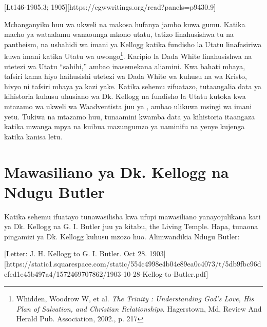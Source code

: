 [Lt146-1905.3; 1905][https://egwwritings.org/read?panels=p9430.9]

Mchanganyiko huu wa ukweli na makosa hufanya jambo kuwa gumu. Katika macho ya wataalamu wanaounga mkono utatu, tatizo linahusishwa tu na pantheism, na ushahidi wa imani ya Kellogg katika fundisho la Utatu linafasiriwa kuwa imani katika Utatu wa uwongo\footnote{Whidden, Woodrow W, et al. \textit{The Trinity : Understanding God's Love, His Plan of Salvation, and Christian Relationships}. Hagerstown, Md, Review And Herald Pub. Association, 2002., p. 217}. Karipio la Dada White linahusishwa na utetezi wa Utatu “sahihi,” ambao inasemekana aliamini. Kwa bahati mbaya, tafsiri kama hiyo haihusishi utetezi wa Dada White wa  kuhusu  na wa Kristo, hivyo ni tafsiri mbaya ya kazi yake. Katika sehemu zifuatazo, tutaangalia data ya kihistoria kuhusu uhusiano wa Dk. Kellogg na fundisho la Utatu kutoka kwa mtazamo wa ukweli wa Waadventista juu ya , ambao ulikuwa msingi wa imani yetu. Tukiwa na mtazamo huu, tunaamini kwamba data ya kihistoria itaangaza katika mwanga mpya na kuibua mazungumzo ya uaminifu na yenye kujenga katika kanisa letu.

\section*{Mawasiliano ya Dk. Kellogg na Ndugu Butler}

Katika sehemu ifuatayo tunawasilisha kwa ufupi mawasiliano yanayojulikana kati ya Dk. Kellogg na G. I. Butler juu ya kitabu, the Living Temple. Hapa, tunaona pingamizi ya Dk. Kellogg kuhusu mzozo huo. Alimwandikia Ndugu Butler:

[Letter: J. H. Kellogg to G. I. Butler. Oct 28. 1903][https://static1.squarespace.com/static/554c4998e4b04e89ea0c4073/t/5db9fbc96defed1e45b497a4/1572469707862/1903-10-28-Kellog-to-Butler.pdf]

